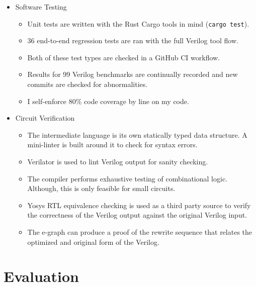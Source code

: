 \documentclass[10pt,letterpaper]{article}
\begin{document}
\begin{itemize}
    \item Software Testing
          \begin{itemize}
              \item Unit tests are written with the Rust Cargo tools in mind (\texttt{cargo test}).
              \item 36 end-to-end regression tests are ran with the full Verilog tool flow.
              \item Both of these test types are checked in a GitHub CI workflow.
              \item Results for 99 Verilog benchmarks are continually recorded and new commits are
                    checked for abnormalities.
              \item I self-enforce 80\% code coverage by line on my code.
          \end{itemize}
    \item Circuit Verification
          \begin{itemize}
              \item The intermediate language is its own statically typed data structure. A
                    mini-linter is built around it to check for syntax errors.
              \item Verilator is used to lint Verilog output for sanity checking.
              \item The compiler performs exhaustive testing of combinational logic. Although, this
                    is only feasible for small circuits.
              \item Yosys RTL equivalence checking is used as a third party source to verify the
                    correctness of the Verilog output against the original Verilog input.
              \item The e-graph can produce a proof of the rewrite sequence that relates the
                    optimized and original form of the Verilog.
          \end{itemize}
\end{itemize}

\section{Evaluation}\label{sec:evaluation}
\end{document}
